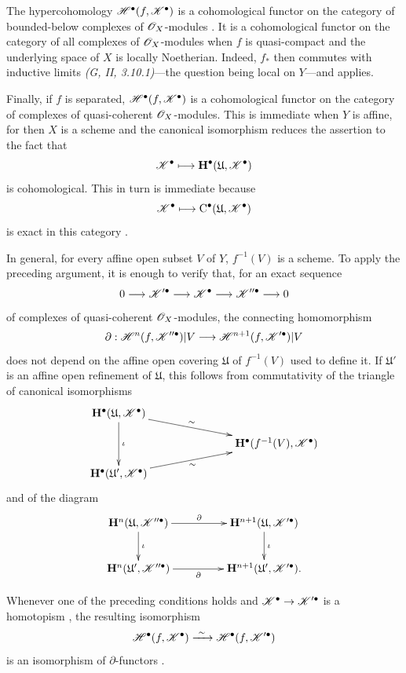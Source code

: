 \begin{env}[6.2.6]
\label{III.6.2.6}
The hypercohomology
$\mathscr{H}^\bullet(f,\mathscr{K}^\bullet)$ is a cohomological functor
on the category of bounded-below complexes of $\mathscr{O}_X$-modules
.  It is a cohomological functor on the category
of all complexes of $\mathscr{O}_X$-modules when $f$ is quasi-compact
and the underlying space of $X$ is locally Noetherian.  Indeed,
$f_*$ then commutes with inductive limits
\emph{(G, II, 3.10.1)}---the question being local on $Y$---and
 applies.

Finally, if $f$ is separated,
$\mathscr{H}^\bullet(f,\mathscr{K}^\bullet)$ is a cohomological functor
on the category of complexes of quasi-coherent
$\mathscr{O}_X$-modules.  This is immediate when $Y$ is affine, for
then $X$ is a scheme and the canonical isomorphism
 reduces the assertion to the fact that
\[
  \mathscr{K}^\bullet\longmapsto
  \mathbf{H}^\bullet(\mathfrak{U},\mathscr{K}^\bullet)
\]
is cohomological.  This in turn is immediate because
\[
  \mathscr{K}^\bullet\longmapsto
  \mathrm{C}^\bullet(\mathfrak{U},\mathscr{K}^\bullet)
\]
is exact in this category .

In general, for every affine open subset $V$ of $Y$,
$f^{-1}(V)$ is a scheme.  To apply the preceding argument, it is
enough to verify that, for an exact sequence
\[
  0\longrightarrow\mathscr{K}'^\bullet
  \longrightarrow\mathscr{K}^\bullet
  \longrightarrow\mathscr{K}''^\bullet
  \longrightarrow0
\]
of complexes of quasi-coherent $\mathscr{O}_X$-modules, the connecting
homomorphism
\[
  \partial:
  \mathscr{H}^n(f,\mathscr{K}''^\bullet)|V
  \longrightarrow
  \mathscr{H}^{n+1}(f,\mathscr{K}'^\bullet)|V
\]
does not depend on the affine open covering $\mathfrak{U}$ of
$f^{-1}(V)$ used to define it.  If $\mathfrak{U}'$ is an affine
open refinement of $\mathfrak{U}$, this follows from commutativity
of the triangle of canonical isomorphisms
\[
  \xymatrix@C=34pt@R=11pt{
    \mathbf{H}^\bullet(\mathfrak{U},\sh{K}^\bullet)
      \ar[rrd]^-{\sim}
      \ar[dd]^{\iota}
    && \\
    &&
    \mathbf{H}^\bullet(f^{-1}(V),\sh{K}^\bullet)
    \\
    \mathbf{H}^\bullet(\mathfrak{U}',\sh{K}^\bullet)
      \ar[rru]_-{\sim}
    &&
  }
\]
and of the diagram
\[
  \xymatrix@C=46pt@R=25pt{
    \mathbf{H}^n(\mathfrak{U},\sh{K}''^\bullet)
      \ar[r]^-{\partial}
      \ar[d]^{\iota}
    &
    \mathbf{H}^{n+1}(\mathfrak{U},\sh{K}'^\bullet)
      \ar[d]^{\iota}
    \\
    \mathbf{H}^n(\mathfrak{U}',\sh{K}''^\bullet)
      \ar[r]_-{\partial}
    &
    \mathbf{H}^{n+1}(\mathfrak{U}',\sh{K}'^\bullet).
  }
\]

Whenever one of the preceding conditions holds and
$\mathscr{K}^\bullet\to\mathscr{K}'^\bullet$ is a homotopism
, the resulting isomorphism
\[
  \mathscr{H}^\bullet(f,\mathscr{K}^\bullet)
  \xrightarrow{\ \sim\ }
  \mathscr{H}^\bullet(f,\mathscr{K}'^\bullet)
\]
is an isomorphism of $\partial$-functors
.
\end{env}


